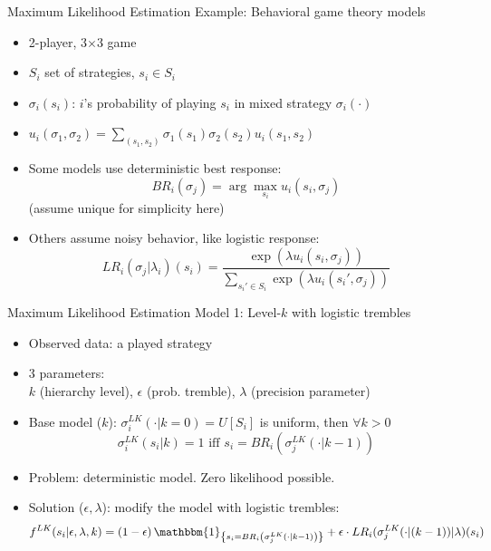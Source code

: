 \begin{frame}{Maximum Likelihood Estimation}
Example: Behavioral game theory models
\begin{itemize}
    \item 2-player, 3$\times$3 game
    \item $S_i$ set of strategies, $s_i \in S_i$
    \item $\sigma_i(s_i)$: $i$'s probability of playing $s_i$ in mixed strategy $\sigma_i(\cdot)$
    \item $u_i(\sigma_1, \sigma_2)=\sum_{(s_1,s_2)}\sigma_1(s_1)\sigma_2(s_2)u_i(s_1,s_2)$
    \item Some models use deterministic best response:
    $$BR_i(\sigma_j)=\arg\max_{s_i}u_i(s_i,\sigma_j)$$
    (assume unique for simplicity here)
    \item Others assume noisy behavior, like logistic response:
    \[
    LR_i(\sigma_j|\lambda_i)(s_i) = \frac{\exp(\lambda u_i(s_i,\sigma_j))}{\sum_{s_i' \in S_i}\exp(\lambda u_i(s_i',\sigma_j))}
    \]
\end{itemize}
\end{frame}

\begin{frame}{Maximum Likelihood Estimation}
Model 1: Level-$k$ with logistic trembles
\begin{itemize}
    \item Observed data: a played strategy
    \item 3 parameters:\\ $k$ (hierarchy level), $\epsilon$ (prob. tremble), $\lambda$ (precision parameter)
    \item Base model ($k$): $\sigma_i^{LK}(\cdot|k=0)=U[S_i]$ is uniform, then $\forall k > 0$
    $$\sigma_i^{LK}(s_i|k)=1 \text{ iff } s_i = BR_i\left(\sigma_j^{LK}(\cdot|k-1)\right)$$
    \item Problem: deterministic model. Zero likelihood possible.
    \item Solution ($\epsilon,\lambda$): modify the model with logistic trembles:
        \begin{equation*}
        f^{LK}(s_i|\epsilon,\lambda,k)=
        (1-\epsilon)\,\mathbbm{1}_{\left\{s_i = BR_i\left(\sigma_j^{LK}(\cdot|k-1)\right)\right\}} + \epsilon \cdot LR_i(\sigma_j^{LK}(\cdot|(k-1))|\lambda)(s_i)
        \end{equation*}
\end{itemize}

\end{frame}


